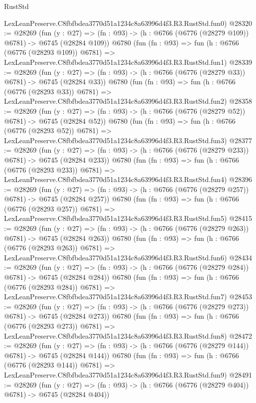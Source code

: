 \begin{lexlean}{RustStd}
\begin{coremodule}
    LexLeanPreserve.C8fbfbdea3770d51a1234c8a63996d4f3.R3.RustStd.fun0)
@28320 := @28269
    (fun (y : @27) => (fn : @93) -> (h : @6766 (@6776 (@28279 @109)) @6781) -> @6745 (@28284 @109))
    @6780
    (fun (fn : @93) =>
    fun (h : @6766 (@6776 (@28293 @109)) @6781) =>
    LexLeanPreserve.C8fbfbdea3770d51a1234c8a63996d4f3.R3.RustStd.fun1)
@28339 := @28269
    (fun (y : @27) => (fn : @93) -> (h : @6766 (@6776 (@28279 @33)) @6781) -> @6745 (@28284 @33))
    @6780
    (fun (fn : @93) =>
    fun (h : @6766 (@6776 (@28293 @33)) @6781) =>
    LexLeanPreserve.C8fbfbdea3770d51a1234c8a63996d4f3.R3.RustStd.fun2)
@28358 := @28269
    (fun (y : @27) => (fn : @93) -> (h : @6766 (@6776 (@28279 @52)) @6781) -> @6745 (@28284 @52))
    @6780
    (fun (fn : @93) =>
    fun (h : @6766 (@6776 (@28293 @52)) @6781) =>
    LexLeanPreserve.C8fbfbdea3770d51a1234c8a63996d4f3.R3.RustStd.fun3)
@28377 := @28269
    (fun (y : @27) => (fn : @93) -> (h : @6766 (@6776 (@28279 @233)) @6781) -> @6745 (@28284 @233))
    @6780
    (fun (fn : @93) =>
    fun (h : @6766 (@6776 (@28293 @233)) @6781) =>
    LexLeanPreserve.C8fbfbdea3770d51a1234c8a63996d4f3.R3.RustStd.fun4)
@28396 := @28269
    (fun (y : @27) => (fn : @93) -> (h : @6766 (@6776 (@28279 @257)) @6781) -> @6745 (@28284 @257))
    @6780
    (fun (fn : @93) =>
    fun (h : @6766 (@6776 (@28293 @257)) @6781) =>
    LexLeanPreserve.C8fbfbdea3770d51a1234c8a63996d4f3.R3.RustStd.fun5)
@28415 := @28269
    (fun (y : @27) => (fn : @93) -> (h : @6766 (@6776 (@28279 @263)) @6781) -> @6745 (@28284 @263))
    @6780
    (fun (fn : @93) =>
    fun (h : @6766 (@6776 (@28293 @263)) @6781) =>
    LexLeanPreserve.C8fbfbdea3770d51a1234c8a63996d4f3.R3.RustStd.fun6)
@28434 := @28269
    (fun (y : @27) => (fn : @93) -> (h : @6766 (@6776 (@28279 @284)) @6781) -> @6745 (@28284 @284))
    @6780
    (fun (fn : @93) =>
    fun (h : @6766 (@6776 (@28293 @284)) @6781) =>
    LexLeanPreserve.C8fbfbdea3770d51a1234c8a63996d4f3.R3.RustStd.fun7)
@28453 := @28269
    (fun (y : @27) => (fn : @93) -> (h : @6766 (@6776 (@28279 @273)) @6781) -> @6745 (@28284 @273))
    @6780
    (fun (fn : @93) =>
    fun (h : @6766 (@6776 (@28293 @273)) @6781) =>
    LexLeanPreserve.C8fbfbdea3770d51a1234c8a63996d4f3.R3.RustStd.fun8)
@28472 := @28269
    (fun (y : @27) => (fn : @93) -> (h : @6766 (@6776 (@28279 @144)) @6781) -> @6745 (@28284 @144))
    @6780
    (fun (fn : @93) =>
    fun (h : @6766 (@6776 (@28293 @144)) @6781) =>
    LexLeanPreserve.C8fbfbdea3770d51a1234c8a63996d4f3.R3.RustStd.fun9)
@28491 := @28269
    (fun (y : @27) => (fn : @93) -> (h : @6766 (@6776 (@28279 @404)) @6781) -> @6745 (@28284 @404))

\end{coremodule}
\end{lexlean}

